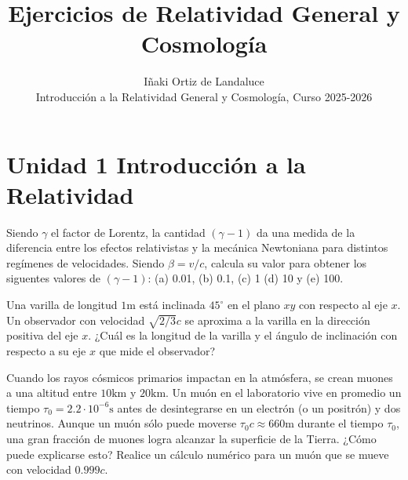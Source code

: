 \documentclass[12pt]{article}
\newenvironment{exercise}[2][Ejercicio]{\begin{trivlist} 
\item[\hskip \labelsep {\bfseries #1}\hskip \labelsep {\bfseries #2.}]}{\end{trivlist}}
\begin{document}
 
 
\title{Ejercicios de Relatividad General y Cosmología}
\author{Iñaki Ortiz de Landaluce\\ 
Introducción a la Relatividad General y Cosmología, Curso 2025-2026}
\date{} 
\maketitle

\section*{Unidad 1 Introducción a la Relatividad}

\begin{exercise}{1.1} Siendo $\gamma$ el factor de Lorentz, la cantidad $(\gamma -1)$ da una medida de la diferencia entre los efectos relativistas y la mecánica Newtoniana para distintos regímenes de velocidades. Siendo $\beta=v/c$, calcula su valor para obtener los siguentes valores de $(\gamma-1)$: (a) 0.01, (b) 0.1, (c) 1 (d) 10 y (e) 100.
\end{exercise}

\begin{exercise}{1.2} Una varilla de longitud $1 \text{m}$ está inclinada $45^\circ$ en el plano $xy$ con respecto al eje $x$. Un observador con velocidad $\sqrt{2/3}c$ se aproxima a la varilla en la dirección positiva del eje $x$. ¿Cuál es la longitud de la varilla y el ángulo de inclinación con respecto a su eje $x$ que mide el observador?
\end{exercise}

\begin{exercise}{1.3} Cuando los rayos cósmicos primarios impactan en la atmósfera, se crean muones a una altitud entre $10 \text{km}$ y $20 \text{km}$. Un muón en el laboratorio vive en promedio un tiempo $\tau_0 = 2.2 \cdot 10^{-6} \text{s}$ antes de desintegrarse en un electrón (o un positrón) y dos neutrinos. Aunque un muón sólo puede moverse $\tau_0 c \approx 660 \text{m}$ durante el tiempo $\tau_0$, una gran fracción de muones logra alcanzar la superficie de la Tierra. ¿Cómo puede explicarse esto? Realice un cálculo numérico para un muón que se mueve con velocidad $0.999c$.
\end{exercise}
\end{document}
